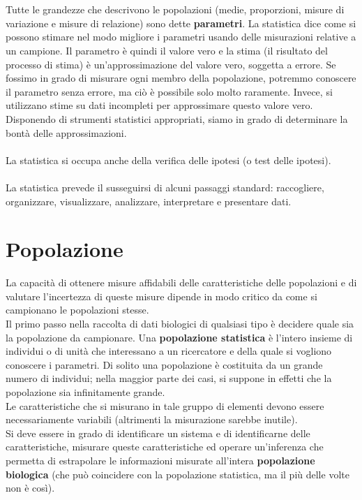 \documentclass[10pt, draft]{book}
\begin{document}
\\
\\
Tutte le grandezze che descrivono le popolazioni (medie, proporzioni, misure di variazione e misure di relazione) sono dette \textbf{parametri}. La statistica dice come si possono stimare nel modo migliore i parametri usando delle misurazioni relative a un campione. Il parametro è quindi il valore vero e la stima (il risultato del processo di stima) è un'approssimazione del valore vero, soggetta a errore. Se fossimo in grado di misurare ogni membro della popolazione, potremmo conoscere il parametro senza errore, ma ciò è possibile solo molto raramente. Invece, si utilizzano stime su dati incompleti per approssimare questo valore vero. Disponendo di strumenti statistici appropriati, siamo in grado di determinare la bontà delle approssimazioni.
\\
\\
La statistica si occupa anche della verifica delle ipotesi (o test delle ipotesi).
\\
\\
La statistica prevede il susseguirsi di alcuni passaggi standard: raccogliere, organizzare, visualizzare, analizzare, interpretare e presentare dati.

\section{Popolazione}
La capacità di ottenere misure affidabili delle caratteristiche delle popolazioni e di valutare l'incertezza di queste misure dipende in modo critico da come si campionano le popolazioni stesse.
\\
Il primo passo nella raccolta di dati biologici di qualsiasi tipo è decidere quale sia la popolazione da campionare. Una \textbf{popolazione statistica} è l'intero insieme di individui o di unità che interessano a un ricercatore e della quale si vogliono conoscere i parametri. Di solito una popolazione è costituita da un grande numero di individui; nella maggior parte dei casi, si suppone in effetti che la popolazione sia infinitamente grande.
\\
Le caratteristiche che si misurano in tale gruppo di elementi devono essere necessariamente variabili (altrimenti la misurazione sarebbe inutile).
\\
Si deve essere in grado di identificare un sistema e di identificarne delle caratteristiche, misurare queste caratteristiche ed operare un’inferenza che permetta di estrapolare le informazioni misurate all’intera \textbf{popolazione biologica} (che può coincidere con la popolazione statistica, ma il più delle volte non è così).
\end{document}
